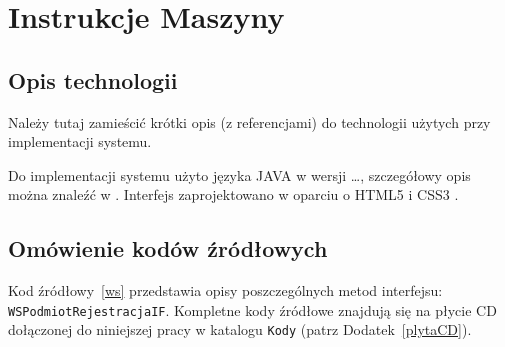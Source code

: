 \chapter{Instrukcje Maszyny}
\thispagestyle{chapterBeginStyle}

\iffalse
\section{Opis technologii}

Należy tutaj zamieścić krótki opis (z referencjami) do technologii użytych przy implementacji systemu.

{\color{dgray}
Do implementacji systemu użyto języka JAVA w wersji \ldots, szczegółowy opis można znaleźć w \cite{Java}. Interfejs zaprojektowano w oparciu o HTML5 i CSS3 \cite{HTML-CSS}.
}

\section{Omówienie kodów źródłowych}

{\color{dgray}
Kod źródłowy~\ref{ws} przedstawia opisy poszczególnych metod interfejsu: \texttt{WSPodmiotRejestracjaIF}. Kompletne
kody źródłowe znajdują się na płycie CD dołączonej do niniejszej pracy w katalogu \texttt{Kody} (patrz Dodatek~\ref{plytaCD}).
}

